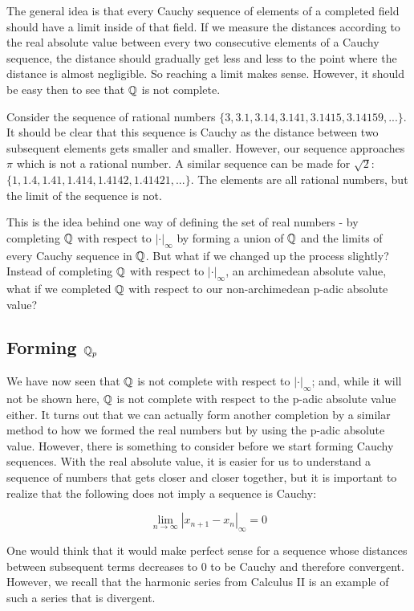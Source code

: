 \documentclass[a4paper]{article}
\begin{document}
The general idea is that every Cauchy sequence of elements of a
completed field should have a limit inside of that field.  If we
measure the distances according to the real absolute value
between every two consecutive elements of a Cauchy sequence, the 
distance should gradually get less and less to the point where the 
distance is almost negligible.  So reaching a limit makes sense.  
However, it should be easy then to see that \(\mathbb Q\) is not complete.

Consider the sequence of rational numbers 
\(\{3,3.1,3.14,3.141,3.1415,3.14159,...\}\). 
It should be clear that this sequence is Cauchy as the distance
between two subsequent elements gets smaller and smaller.  
However, our sequence approaches \(\pi\) which is not a rational 
number.  A similar sequence can be made for \(\sqrt{2}\): 
\(\{1,1.4,1.41,1.414,1.4142,1.41421,...\}\).  The elements are all 
rational numbers, but the limit of the sequence is not.

This is the idea behind one way of defining the set of real 
numbers - by completing \(\mathbb Q\) with respect to 
\(|\cdot|_\infty\) by forming a union of \(\mathbb Q\) and the limits 
of every Cauchy sequence in \(\mathbb Q\).  But what if we changed up
the process slightly?  Instead of completing \(\mathbb Q\) with 
respect to \(|\cdot|_\infty\), an archimedean absolute value, what 
if we completed \(\mathbb Q\) with respect to our non-archimedean 
p-adic absolute value?

\subsection{Forming $\mathbb Q_p$}

We have now seen that $\mathbb Q$ is not complete with respect to 
$|\cdot|_\infty$; and, while it will not be shown here, $\mathbb Q$ is not 
complete with respect to the p-adic absolute value either. It turns 
out that we can actually form another completion by a similar method to
how we formed the real numbers but by using the p-adic absolute value.
However, there is something to consider before we start forming Cauchy
sequences.  With the real absolute value, it is easier for us to understand
a sequence of numbers that gets closer and closer together, but it is
important to realize that the following does not imply a sequence is 
Cauchy:

\[
	\lim_{n\to\infty}|x_{n+1}-x_n|_\infty=0
\]

One would think that it would make perfect sense for a sequence
whose distances between subsequent terms decreases to 0 to be
Cauchy and therefore convergent.  However, we recall that the
harmonic series from Calculus II is an example of such a series that is
divergent.
\end{document}
